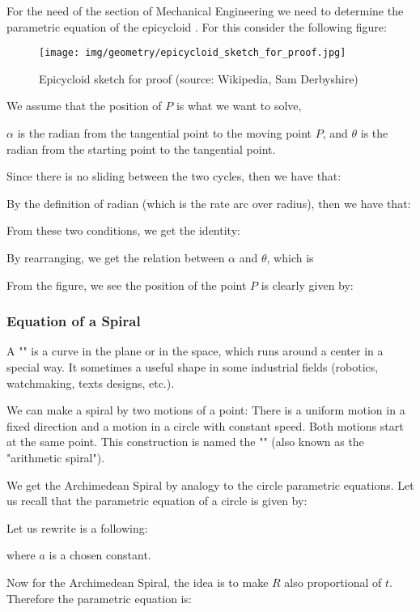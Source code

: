 	For the need of the section of Mechanical Engineering we need to determine the parametric equation of the epicycloid . For this consider the following figure:
	\begin{figure}[H]
		\centering
		\texttt{[image: img/geometry/epicycloid\_sketch\_for\_proof.jpg]}
		\caption[Epicycloid sketch for proof]{Epicycloid sketch for proof (source: Wikipedia, Sam Derbyshire)}
	\end{figure}
	We assume that the position of $P$ is what we want to solve, {$\alpha$  is the radian from the tangential point to the moving point $P$, and $\theta$  is the radian from the starting point to the tangential point.

	Since there is no sliding between the two cycles, then we have that:
	
	By the definition of radian (which is the rate arc over radius), then we have that:
		
	From these two conditions, we get the identity:
	
	By rearranging, we get the relation between $\alpha$  and $\theta$, which is
	
	From the figure, we see the position of the point $P$ is clearly given by:
	
	
	\subsubsection{Equation of a Spiral}
	A "" is a curve in the plane or in the space, which runs around a center in a special way. It sometimes a useful shape in some industrial fields (robotics, watchmaking, texts designs, etc.).
	
	We can make a spiral by two motions of a point: There is a uniform motion in a fixed direction and a motion in a circle with constant speed. Both motions start at the same point. This construction is named the ""  (also known as the "arithmetic spiral").
	
	We get the Archimedean Spiral by analogy to the circle parametric equations.  Let us recall that the parametric equation of a circle is given by:
	
	Let us rewrite is a following:
	
	where $a$ is a chosen constant.
	
	Now for the Archimedean Spiral, the idea is to make $R$ also proportional of $t$. Therefore the parametric equation is:
	
}
